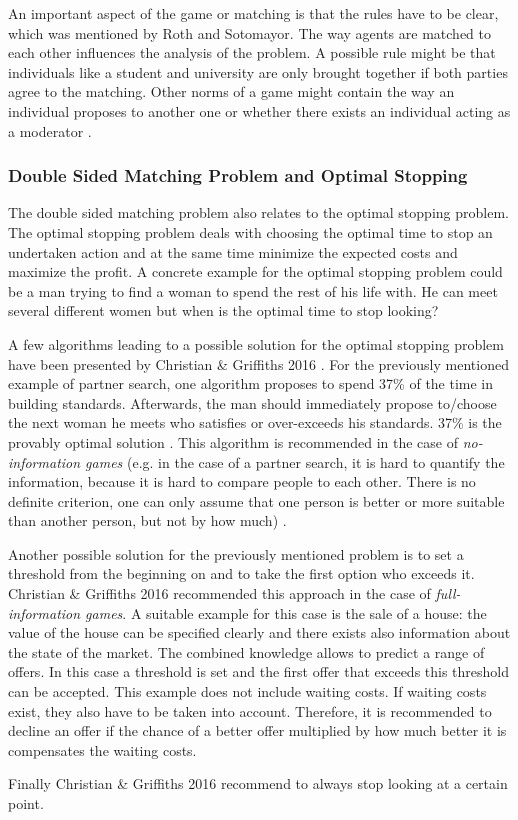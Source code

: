 An important aspect of the game or matching is that the rules have to be clear, which was mentioned by Roth and Sotomayor.
The way agents are matched to each other influences the analysis of the problem.
A possible rule might be that individuals like a student and university are only brought together if both parties agree to the matching.
Other norms of a game might contain the way an individual proposes to another one or whether there exists an individual acting as a moderator \cite[p. 492]{roth1992two}.

\clearpage
\subsubsection{Double Sided Matching Problem and Optimal Stopping}
The double sided matching problem also relates to the optimal stopping problem. 
The optimal stopping problem deals with choosing the optimal time to stop an undertaken action and at the same time minimize the expected costs and maximize the profit. 
A concrete example for the optimal stopping problem could be a man trying to find a woman to spend the rest of his life with. 
He can meet several different women but when is the optimal time to stop looking?

A few algorithms leading to a possible solution for the optimal stopping problem have been presented by Christian \& Griffiths 2016 \cite{algtoliveby}. 
For the previously mentioned example of partner search, one algorithm proposes to spend 37\% of the time in building standards. 
Afterwards, the man should immediately propose to/choose the next woman he meets who satisfies or over-exceeds his standards.
37\% is the provably optimal solution \cite[p. 2]{algtoliveby}. 
This algorithm is recommended in the case of \textit{no-information games} (e.g. in the case of a partner search, it is hard to quantify the information, because it is hard to compare people to each other. There is no definite criterion, one can only assume that one person is better or more suitable than another person, but not by how much) \cite[p. 18]{algtoliveby}.

Another possible solution for the previously mentioned problem is to set a threshold from the beginning on and to take the first option who exceeds it. 
Christian \& Griffiths 2016 \cite{algtoliveby} recommended this approach in the case of \textit{full-information games}.
A suitable example for this case is the sale of a house: the value of the house can be specified clearly and there exists also information about the state of the market. 
The combined knowledge allows to predict a range of offers. 
In this case a threshold is set and the first offer that exceeds this threshold can be accepted.
This example does not include waiting costs. 
If waiting costs exist, they also have to be taken into account. 
Therefore, it is recommended to decline an offer if the chance of a better offer multiplied by how much better it is compensates the waiting costs.

Finally Christian \& Griffiths 2016 \cite[pp. 28-30]{algtoliveby} recommend to always stop looking at a certain point.



